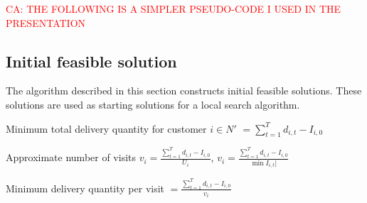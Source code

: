 \documentclass{article}
\begin{document}
\textcolor{red}{CA: THE FOLLOWING IS A SIMPLER PSEUDO-CODE I USED IN THE PRESENTATION}







\subsection{Initial feasible solution}





The algorithm described in this section constructs initial feasible solutions. These solutions are used as starting solutions for a local search algorithm.

Minimum total delivery quantity for customer $i\in N'$ $= \sum^{T}_{t=1}d_{i,t}-I_{i,0}$

Approximate number of visits $v_i= \frac{\sum^T_{t=1}d_{i,t}-I_{i,0}}{U_i}$, $v_i= \frac{\sum^T_{t=1}d_{i,t}-I_{i,0}}{\min{I_{i,t}|}}$

Minimum delivery quantity per visit $=\frac{\sum^T_{t=1}d_{i,t}-I_{i,0}}{v_i}$
\end{document}
